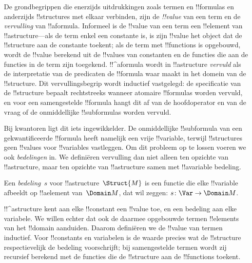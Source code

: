 \documentclass[openany]{memoir}
\begin{document}


\begin{explain}
De grondbegrippen die enerzijds uitdrukkingen zoals termen en
!!{formula}s en anderzijds !!{structure}s met elkaar verbinden, zijn
de \emph{!!{value}} van een term en de \emph{vervulling} van
!!a{formula}. Informeel is de !!{value} van een term een !!{element} van
!!a{structure}---als de term enkel een constante is, is zijn !!{value}
het object dat de !!{structure} aan de constante toekent; als de term
met !!{function}s is opgebouwd, wordt de !!{value} berekend uit de
!!{value}s van constanten en de functies die aan de functies in de term
zijn toegekend. !!^a{formula} wordt in !!a{structure} \emph{vervuld} als
de interpretatie van de predicaten de !!{formula} waar maakt in het
domein van de !!{structure}. Dit vervullingsbegrip wordt inductief
vastgelegd: de specificatie van de !!{structure} bepaalt rechtstreeks
wanneer atomaire !!{formula}s worden vervuld, en voor een samengestelde
!!{formula} hangt dit af van de hoofdoperator en van de vraag of de
onmiddellijke !!{subformula}s worden vervuld.

Bij kwantoren ligt dit iets ingewikkelder. De onmiddellijke
!!{subformula} van een gekwantificeerde !!{formula} heeft namelijk een
vrije !!{variable}, terwijl !!{structure}s geen !!{value}s voor
!!{variable}s vastleggen. Om dit probleem op te lossen voeren we ook
\emph{bedelingen} in. We definiëren vervulling dan niet alleen ten
opzichte van !!a{structure}, maar ten opzichte van !!a{structure}
samen met !!a{variable} bedeling.
\end{explain}

\begin{defn}[Bedeling]
Een \emph{bedeling}~$s$ voor !!a{structure}~$\Struct{M}$ is een
functie die elke !!{variable} afbeeldt op !!a{element} van~$\Domain M$,
dat wil zeggen: $s\colon \Var \to \Domain M$.
\end{defn}

\begin{explain}
!!^a{structure} kent aan elke !!{constant} een !!{value} toe, en een
bedeling aan elke variabele. We willen echter dat ook de daarmee
opgebouwde termen !!{element}s van het !!{domain} aanduiden. Daarom
definiëren we de !!{value} van termen inductief. Voor !!{constant}s en
variabelen is de waarde precies wat de !!{structure} respectievelijk de
bedeling voorschrijft; bij samengestelde termen wordt zij recursief
berekend met de functies die de !!{structure} aan de !!{function}s
toekent.
\end{explain}
\end{document}
